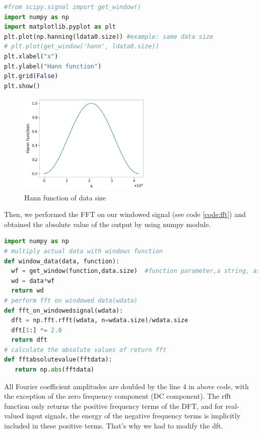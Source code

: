 \begin{lstlisting}[language=Python, caption=Hann Windows Function of data size, label=code:Hann]
#from scipy.signal import get_window()
import numpy as np
import matplotlib.pyplot as plt
plt.plot(np.hanning(ldata0.size)) #example: same data size
# plt.plot(get_window('hann', ldata0.size))  
plt.xlabel("x")
plt.ylabel("Hann function")
plt.grid(False)
plt.show()
\end{lstlisting}
\vspace{0.7cm}
\begin{figure}[h]
        \centering
        \includegraphics[width=2.5in]{images_/nphanning.png}
        \caption{ Hann function of data size}
        \label{fig:hannFunction}
\end{figure}
\vspace{0.5cm}
Then, we performed the FFT on our windowed signal (see code \ref{code:fft}) and obtained the absolute value of the output by using numpy module.
\begin{lstlisting}[language=Python, caption=FFT on windowed signal using numpy, label=code:fft]
import numpy as np
# multiply actual data with windows function
def window_data(data, function):
  wf = get_window(function,data.size)  #function parameter,a string, as window function
  wd = data*wf
  return wd
# perform fft on windowed data(wdata)
def fft_on_windowedsignal(wdata):
  dft = np.fft.rfft(wdata, n=wdata.size)/wdata.size
  dft[1:] *= 2.0
  return dft
# calculate the absolute values of return fft
def fftabsolutevalue(fftdata):
   return np.abs(fftdata)
\end{lstlisting}
All Fourier coefficient amplitudes are doubled by the line 4 in above code, with the exception of the zero frequency component (DC component). The rfft function only returns the positive frequency terms of the DFT, and for real-valued input signals, the energy of the negative frequency terms is implicitly included in these positive terms. That's why we had to modify the dft.

